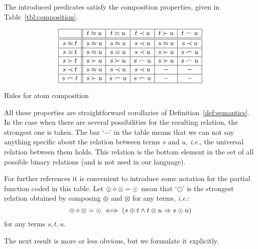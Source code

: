 \begin{LEMMA} \label{le:composition}
The introduced predicates satisfy the composition properties, giv\-en in
Table~\ref {tbl:composition}.
\begin{table}[hbt]
\[\begin{array}{|c||c|c|c|c|c|}
\hline
          & t\mathbin{\approx} u   & t\mathbin{\asymp} u  & t\mathbin{\prec} u & t\mathbin{\succ} u & t\mathbin{\frown} u\\
\hline 
\hline
s\mathbin{\approx} t    & s\mathbin{\approx} u   & s\mathbin{\approx} u     & s\mathbin{\prec} u & s\mathbin{\approx} u   & s\mathbin{\prec} u \\
\hline 
s\mathbin{\asymp} t & s\mathbin{\approx} u   & s \mathbin{\asymp} u & s\mathbin{\prec} u & s\mathbin{\succ} u & s\mathbin{\frown} u\\
\hline 
s\mathbin{\succ} t  & s\mathbin{\succ} u & s\mathbin{\succ} u   & s\mathbin{\frown} u  & s\mathbin{\succ} u & s\mathbin{\frown} u\\
\hline 
s\mathbin{\prec} t  & s\mathbin{\approx} u   & s\mathbin{\prec}  u  & s\mathbin{\prec} u & -        & -    \\
\hline 
s\mathbin{\frown} t   & s\mathbin{\succ} u & s\mathbin{\frown}  u   & s\mathbin{\frown} u  & -        & -    \\
\hline 
\end{array}\]
\caption{Rules for atom composition} \label{tbl:composition}
\end{table}
\end{LEMMA}
\begin{PROOF}
All these properties are straightforward corollaries of
Definition~\ref{def:semantics}. 
In the case when there are several possibilities
for the resulting relation, the strongest one is taken. The bar `$-$' in the
table means that we can not say anything specific about the 
relation between terms
$s$ and $u$, {\em i.e.}, the universal relation between them holds. This relation is
the bottom element in the set of all possible binary relations 
(and is not used in our language).
\end{PROOF}

For further references it is convenient to introduce some notation for the
partial function coded in this table. Let \(\oplus\diamond\otimes=\odot\) mean
that `$\odot$' is the strongest relation obtained by composing \(\oplus\) and
\(\otimes\) for any terms, {\em i.e.}:
\[\oplus\diamond\otimes=\odot\iff(s\oplus t\land t\otimes u\mathrel\Rightarrow s\odot u)\]
for any terms $s,t,u$.

The next result is more or less obvious, but we formulate it explicitly.

